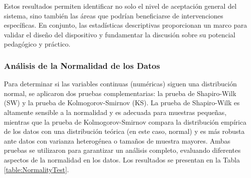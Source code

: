 				Estos resultados permiten identificar no solo el nivel de aceptación general del sistema, sino también las áreas que podrían beneficiarse de intervenciones específicas. En conjunto, las estadísticas descriptivas proporcionan un marco para validar el diseño del dispositivo y fundamentar la discusión sobre su potencial pedagógico y práctico.
				
			\subsubsection{Análisis de la Normalidad de los Datos}
				Para determinar si las variables continuas (numéricas) siguen una distribución normal, se aplicaron dos pruebas complementarias: la prueba de Shapiro-Wilk (SW) y la prueba de Kolmogorov-Smirnov (KS). La prueba de Shapiro-Wilk es altamente sensible a la normalidad y es adecuada para muestras pequeñas, mientras que la prueba de Kolmogorov-Smirnov compara la distribución empírica de los datos con una distribución teórica (en este caso, normal) y es más robusta ante datos con varianza heterogénea o tamaños de muestra mayores. Ambas pruebas se utilizaron para garantizar un análisis completo, evaluando diferentes aspectos de la normalidad en los datos. Los resultados se presentan en la Tabla \ref{table:NormalityTest}.
				
